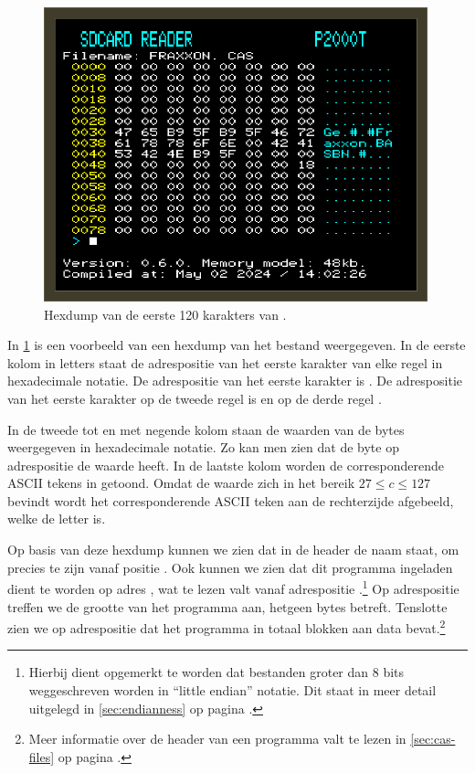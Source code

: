 \begin{figure}[h!]
    \centering
    \includegraphics[width=0.99\textwidth]{img/hexdump-fraxxon.png}
    \caption{Hexdump van de eerste 120 karakters van .}
    \label{fig:screenshot-hexdump-fraxxon}
\end{figure}

In \cref{fig:screenshot-hexdump-fraxxon} is een voorbeeld van een hexdump van het bestand  weergegeven. In de eerste kolom in  letters staat de adrespositie van het eerste karakter van elke regel in hexadecimale notatie. De adrespositie van het eerste karakter is . De adrespositie van het eerste karakter op de tweede regel is  en op de derde regel .

In de tweede tot en met negende kolom staan de waarden van de bytes weergegeven in hexadecimale notatie. Zo kan men zien dat de byte op adrespositie  de waarde  heeft. In de laatste kolom worden de corresponderende ASCII tekens in  getoond. Omdat de waarde  zich in het bereik $27 \leq c \leq 127$ bevindt wordt het corresponderende ASCII teken aan de rechterzijde afgebeeld, welke de letter  is.

Op basis van deze hexdump kunnen we zien dat in de header de naam  staat, om precies te zijn vanaf positie . Ook kunnen we zien dat dit programma ingeladen dient te worden op adres , wat te lezen valt vanaf adrespositie .\footnote{Hierbij dient opgemerkt te worden dat bestanden groter dan 8 bits weggeschreven worden in ``little endian'' notatie. Dit staat in meer detail uitgelegd in \cref{sec:endianness} op pagina \pageref{sec:endianness}.} Op adrespositie  treffen we de grootte van het programma aan, hetgeen  bytes betreft. Tenslotte zien we op adrespositie  dat het programma in totaal  blokken aan data bevat.\footnote{Meer informatie over de header van een \cas programma valt te lezen in \cref{sec:cas-files} op pagina \pageref{sec:cas-files}.}

